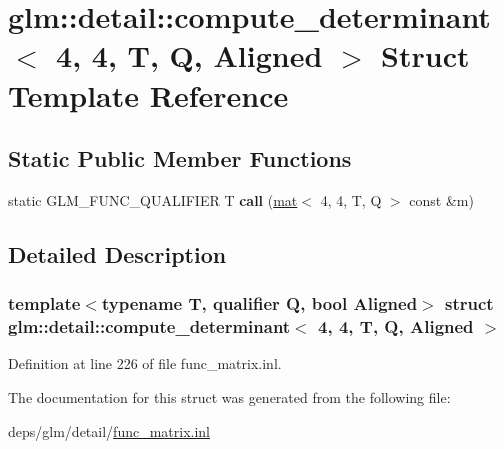 \hypertarget{structglm_1_1detail_1_1compute__determinant_3_014_00_014_00_01T_00_01Q_00_01Aligned_01_4}{}\section{glm\+:\+:detail\+:\+:compute\+\_\+determinant$<$ 4, 4, T, Q, Aligned $>$ Struct Template Reference}
\label{structglm_1_1detail_1_1compute__determinant_3_014_00_014_00_01T_00_01Q_00_01Aligned_01_4}
\subsection*{Static Public Member Functions}
\begin{DoxyCompactItemize}
\item 
\mbox{\label{structglm_1_1detail_1_1compute__determinant_3_014_00_014_00_01T_00_01Q_00_01Aligned_01_4_aa3ac8758c4b0477657d8df5061017f2e}} 
static G\+L\+M\+\_\+\+F\+U\+N\+C\+\_\+\+Q\+U\+A\+L\+I\+F\+I\+ER T {\bfseries call} (\hyperlink{structglm_1_1mat}{mat}$<$ 4, 4, T, Q $>$ const \&m)
\end{DoxyCompactItemize}


\subsection{Detailed Description}
\subsubsection*{template$<$typename T, qualifier Q, bool Aligned$>$\newline
struct glm\+::detail\+::compute\+\_\+determinant$<$ 4, 4, T, Q, Aligned $>$}



Definition at line 226 of file func\+\_\+matrix.\+inl.



The documentation for this struct was generated from the following file\+:\begin{DoxyCompactItemize}
\item 
deps/glm/detail/\hyperlink{func__matrix_8inl}{func\+\_\+matrix.\+inl}\end{DoxyCompactItemize}
